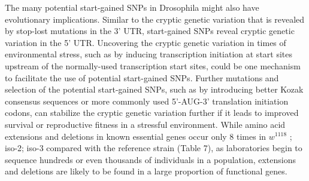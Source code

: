 The many potential start-gained SNPs in Drosophila might also have evolutionary implications. Similar to the cryptic genetic variation that is revealed by stop-lost mutations in the 3' UTR, start-gained SNPs reveal cryptic genetic variation in the 5' UTR. Uncovering the cryptic genetic variation in times of environmental stress, such as by inducing transcription initiation at start sites upstream of the normally-used transcription start sites, could be one mechanism to facilitate the use of potential start-gained SNPs. Further mutations and selection of the potential start-gained SNPs, such as by introducing better Kozak consensus sequences or more commonly used 5'-AUG-3' translation initiation codons, can stabilize the cryptic genetic variation further if it leads to improved survival or reproductive fitness in a stressful environment. While amino acid extensions and deletions in known essential genes occur only 8 times in $w^{1118}$ ; iso-2; iso-3 compared with the reference strain (Table 7), as laboratories begin to sequence hundreds or even thousands of individuals in a population, extensions and deletions are likely to be found in a large proportion of functional genes.


